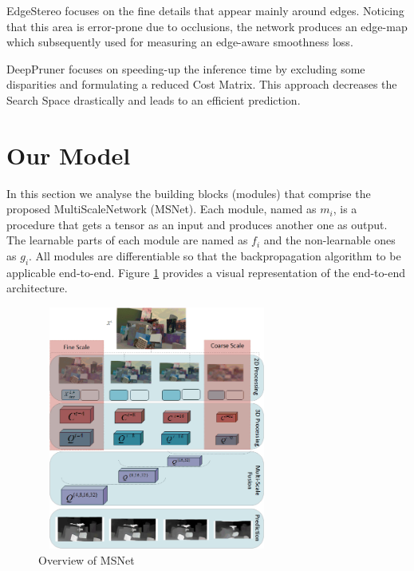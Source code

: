 \documentclass[runningheads]{llncs}
\begin{document}
EdgeStereo \cite{SongEdgeStereoResidual} focuses on the fine details that appear mainly around edges. Noticing that this area is error-prone due to occlusions, the network produces an edge-map which subsequently used for measuring an edge-aware smoothness loss.

DeepPruner \cite{du2019amnet} focuses on speeding-up the inference time by excluding some disparities and formulating a reduced Cost Matrix. This approach decreases the Search Space drastically and leads to an efficient prediction.




\section{Our Model}

In this section we analyse the building blocks (modules) that comprise the proposed MultiScaleNetwork (MSNet). Each module, named as $m_i$, is a procedure that gets a tensor as an input and produces another one as output. The learnable parts of each module are named as $f_i$ and the non-learnable ones as $g_i$. All modules are differentiable so that the backpropagation algorithm to be applicable end-to-end. Figure \ref{fig:cnn_architecture} provides a visual representation of the end-to-end architecture.

\begin{figure}[!htbp]
    \centering
    \includegraphics[width=0.7\textwidth, height=8cm]{figures/stereo_architecture.png}
    \caption{Overview of MSNet}
    \label{fig:cnn_architecture}
\end{figure}
\end{document}
